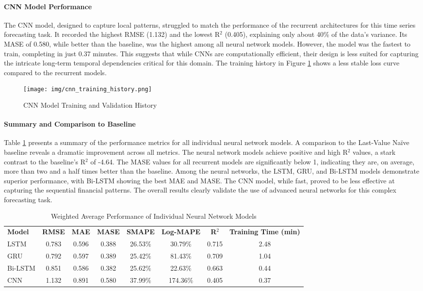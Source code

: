 \paragraph{CNN Model Performance}
The CNN model, designed to capture local patterns, struggled to match the performance of the recurrent architectures for this time series forecasting task. It recorded the highest RMSE (1.132) and the lowest R$^2$ (0.405), explaining only about 40\% of the data's variance. Its MASE of 0.580, while better than the baseline, was the highest among all neural network models. However, the model was the fastest to train, completing in just 0.37 minutes. This suggests that while CNNs are computationally efficient, their design is less suited for capturing the intricate long-term temporal dependencies critical for this domain. The training history in Figure \ref{fig:cnn_training_history} shows a less stable loss curve compared to the recurrent models.
\begin{figure}[h!]
\centering
\texttt{[image: img/cnn\_training\_history.png]}
\caption{CNN Model Training and Validation History}
\label{fig:cnn_training_history}
\end{figure}

\paragraph{Summary and Comparison to Baseline}
Table \ref{tab:nn_performance} presents a summary of the performance metrics for all individual neural network models. A comparison to the Last-Value Naïve baseline reveals a dramatic improvement across all metrics. The neural network models achieve positive and high R$^2$ values, a stark contrast to the baseline's R$^2$ of -4.64. The MASE values for all recurrent models are significantly below 1, indicating they are, on average, more than two and a half times better than the baseline. Among the neural networks, the LSTM, GRU, and Bi-LSTM models demonstrate superior performance, with Bi-LSTM showing the best MAE and MASE. The CNN model, while fast, proved to be less effective at capturing the sequential financial patterns. The overall results clearly validate the use of advanced neural networks for this complex forecasting task.

\begin{table}[h!]
\centering
\caption{Weighted Average Performance of Individual Neural Network Models}
\label{tab:nn_performance}
\begin{tabular}{lccccccc}
\textbf{Model} & \textbf{RMSE} & \textbf{MAE} & \textbf{MASE} & \textbf{SMAPE} & \textbf{Log-MAPE} & \textbf{R$^2$} & \textbf{Training Time (min)} \\
LSTM & 0.783 & 0.596 & 0.388 & 26.53\% & 30.79\% & 0.715 & 2.48 \\
GRU & 0.792 & 0.597 & 0.389 & 25.42\% & 81.43\% & 0.709 & 1.04 \\
Bi-LSTM & 0.851 & 0.586 & 0.382 & 25.62\% & 22.63\% & 0.663 & 0.44 \\
CNN & 1.132 & 0.891 & 0.580 & 37.99\% & 174.36\% & 0.405 & 0.37 \\
\end{tabular}
\end{table}

